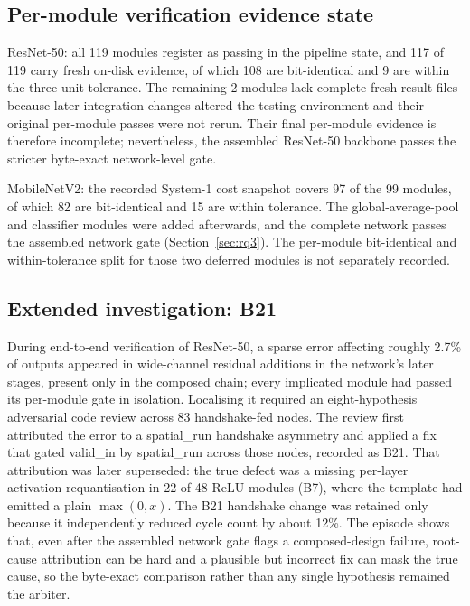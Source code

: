 \documentclass[acmtog,authorversion]{acmart}
\begin{document}
\subsection{Per-module verification evidence state}

ResNet-50: all 119 modules register as passing in the pipeline state, and 117 of 119 carry fresh on-disk evidence, of which 108 are bit-identical and 9 are within the three-unit tolerance. The remaining 2 modules lack complete fresh result files because later integration changes altered the testing environment and their original per-module passes were not rerun. Their final per-module evidence is therefore incomplete; nevertheless, the assembled ResNet-50 backbone passes the stricter byte-exact network-level gate.

MobileNetV2: the recorded System-1 cost snapshot covers 97 of the 99 modules, of which 82 are bit-identical and 15 are within tolerance. The global-average-pool and classifier modules were added afterwards, and the complete network passes the assembled network gate (Section~\ref{sec:rq3}). The per-module bit-identical and within-tolerance split for those two deferred modules is not separately recorded.

\subsection{Extended investigation: B21}

During end-to-end verification of ResNet-50, a sparse error affecting roughly 2.7\% of outputs appeared in wide-channel residual additions in the network's later stages, present only in the composed chain; every implicated module had passed its per-module gate in isolation. Localising it required an eight-hypothesis adversarial code review across 83 handshake-fed nodes. The review first attributed the error to a spatial\_run handshake asymmetry and applied a fix that gated valid\_in by spatial\_run across those nodes, recorded as B21. That attribution was later superseded: the true defect was a missing per-layer activation requantisation in 22 of 48 ReLU modules (B7), where the template had emitted a plain \(\max(0,x)\). The B21 handshake change was retained only because it independently reduced cycle count by about 12\%. The episode shows that, even after the assembled network gate flags a composed-design failure, root-cause attribution can be hard and a plausible but incorrect fix can mask the true cause, so the byte-exact comparison rather than any single hypothesis remained the arbiter.
\end{document}
